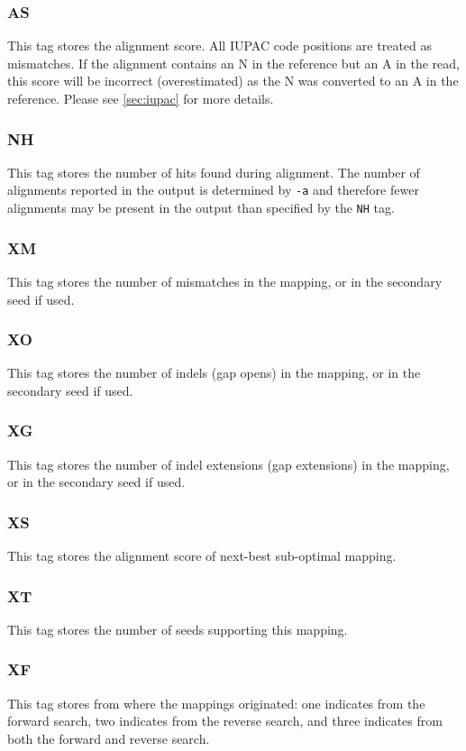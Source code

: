 \documentclass[a4paper,12pt]{book}
\newcommand{\TT}[1]{{\tt #1}} %
\begin{document}
\subsubsection{AS}
This tag stores the alignment score.
All IUPAC code positions are treated as mismatches.
If the alignment contains an N in the reference but an A in the read, this score will be incorrect (overestimated) as the N was converted to an A in the reference.
Please see \autoref{sec:iupac} for more details. 
\subsubsection{NH}
This tag stores the number of hits found during alignment.
The number of alignments reported in the output is determined by \TT{-a} and therefore fewer alignments may be present in the output than specified by the \TT{NH} tag.

\subsubsection{XM}
This tag stores the number of mismatches in the mapping, or in the secondary seed if used.

\subsubsection{XO}
This tag stores the number of indels (gap opens) in the mapping, or in the secondary seed if used.

\subsubsection{XG}
This tag stores the number of indel extensions (gap extensions) in the mapping, or in the secondary seed if used.

\subsubsection{XS}
This tag stores the alignment score of next-best sub-optimal mapping.

\subsubsection{XT}
This tag stores the number of seeds supporting this mapping.
\subsubsection{XF}
This tag stores from where the mappings originated: one indicates from the forward search, two indicates from the reverse search, and three indicates from both the forward and reverse search.
\end{document}

